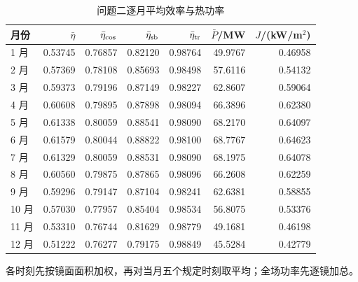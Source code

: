\begin{table}[H]\centering\small
\caption{问题二逐月平均效率与热功率}\label{tab:q2_monthly}
\begin{tabular}{lrrrrrr}\toprule
月份 & $\bar\eta$ & $\bar\eta_{\rm cos}$ & $\bar\eta_{\rm sb}$ & $\bar\eta_{\rm tr}$ & $\bar P$/MW & $J$/(kW/m$^2$)\\\midrule
1 月 & 0.53745 & 0.76857 & 0.82120 & 0.98764 & 49.9767 & 0.46958\\
2 月 & 0.57369 & 0.78108 & 0.85693 & 0.98498 & 57.6116 & 0.54132\\
3 月 & 0.59373 & 0.79196 & 0.87149 & 0.98227 & 62.8607 & 0.59064\\
4 月 & 0.60608 & 0.79895 & 0.87898 & 0.98094 & 66.3896 & 0.62380\\
5 月 & 0.61338 & 0.80059 & 0.88541 & 0.98090 & 68.2170 & 0.64097\\
6 月 & 0.61579 & 0.80044 & 0.88822 & 0.98100 & 68.7767 & 0.64623\\
7 月 & 0.61329 & 0.80059 & 0.88531 & 0.98090 & 68.1975 & 0.64078\\
8 月 & 0.60560 & 0.79875 & 0.87865 & 0.98096 & 66.2608 & 0.62259\\
9 月 & 0.59296 & 0.79147 & 0.87104 & 0.98241 & 62.6381 & 0.58855\\
10 月 & 0.57030 & 0.77957 & 0.85404 & 0.98534 & 56.8075 & 0.53376\\
11 月 & 0.53310 & 0.76744 & 0.81629 & 0.98779 & 49.1681 & 0.46198\\
12 月 & 0.51222 & 0.76277 & 0.79175 & 0.98849 & 45.5284 & 0.42779\\
\bottomrule\end{tabular}
\par\smallskip\begin{minipage}{.94\linewidth}\footnotesize 各时刻先按镜面面积加权，再对当月五个规定时刻取平均；全场功率先逐镜加总。\end{minipage}
\end{table}
